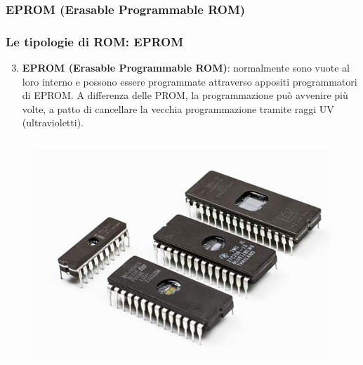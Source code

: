 \subsubsection[EPROM (Erasable Programmable ROM)]{EPROM (Erasable Programmable ROM)}
\begin{frame}
	\frametitle{Le tipologie di ROM: EPROM}
	  
	\begin{block}{}

		\begin{enumerate}
			\setcounter{enumi}{2}
			\item \textbf{EPROM (Erasable Programmable ROM)}: normalmente sono vuote al loro interno e possono  essere  programmate  attraverso appositi programmatori di EPROM. A differenza delle PROM, la programmazione può avvenire più volte, a patto di cancellare la vecchia programmazione tramite raggi UV (ultravioletti).
		\end{enumerate}
		
	\end{block}
	
	\begin{columns}			
		\begin{figure}[!htbp]
			\centering 
			\includegraphics[width=1.0\linewidth]{images/5_memory/eproms.jpg }
		\end{figure}
		

\end{columns}
\end{frame}
